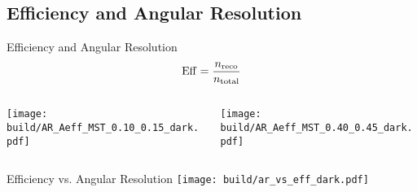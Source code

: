 \subsection{Efficiency and Angular Resolution}%
\label{sub:Efficiency_AR}

\begin{frame}{Efficiency and Angular Resolution}
    \begin{equation*}
        \operatorname{Eff} = \frac{n_\text{reco}}{n_\text{total}}
    \end{equation*}
    \begin{columns}
        \begin{column}{0.48\textwidth}
            \centering
            \texttt{[image: build/AR\_Aeff\_MST\_0.10\_0.15\_dark.pdf]}
        \end{column}
        \begin{column}{0.48\textwidth}
            \centering
            \texttt{[image: build/AR\_Aeff\_MST\_0.40\_0.45\_dark.pdf]}
        \end{column}
    \end{columns}
\end{frame}

\begin{frame}{Efficiency vs. Angular Resolution}
    \centering
    \texttt{[image: build/ar\_vs\_eff\_dark.pdf]}
\end{frame}

